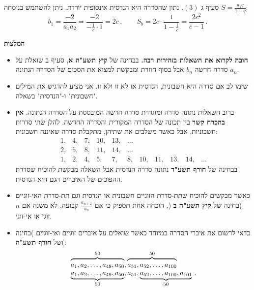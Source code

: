 סעיף ג
$(3)$.
נתון שהסדרה היא הנדסית אינסופית יורדת. ניתן להשתמש בנוסחה 
$S=\displaystyle\frac{a_1q}{1-q}$:
\[
b_1=\frac{-2}{a_1a_2}= \frac{-2}{\displaystyle-\frac{1}{c}\cdot 1}=2c\,,\quad\quad
S_b = 2c\cdot\frac{1}{1-\displaystyle\frac{1}{c}}=\frac{2c^2}{c-1}\,.
\]




\newpage

\begin{center}
\textbf{המלצות}
\end{center}

\begin{itemize}


\item
\textbf{חובה לקרוא את השאלות בזהירות רבה.}
בבחינה של
\textbf{קיץ תשע"ה א},
סעיף ב שואלת על סדרה חדשה
${b_n}$
אבל בסוף חוזרת ומבקשת למצוא את הסכום של הסדרה הנתונה
${a_n}$.

\item
שימו לב אם סדרה היא חשבונית, הנדסית או לא זו ולא זו. אני מציע להדגיש את המילים "חשבונית" ו-"הנדסית" בשאלה.

\item 
ברוב השאלות נתונה סדרה ומוגדרת סדרה חדשה המובססת על הסדרה הנתונה. 
\textbf{אין בהכרח קשר}
בין תכונה של הסדרה המקורית והסדרה החדשה. להלן שתי סדרות חשבוניות, אבל כאשר משלבים את שתיהן, מתקבלת סדרה שאיננה חשבונית:
\[
\begin{array}{rrrrrrrrrrr}
1,& 4,& 7,& 10,& 13,& \ldots\\
2,& 5,& 8,& 11,& 14, &\ldots\\
1,& 2,& 4,& 5,& 7,& 8,& 10,& 11,& 13,& 14, &\ldots
\end{array}
\]
בבחינה של
\textbf{חורף תשע"ד}
נתונה סדרה הנדסית אבל השאלה מבקשת להוכיח שסדרת ההפוכים של האיברים הגם היא הנדסית.

\item
כאשר מבקשים להוכיח שתת-סדרת הזוגיים חשבונית או הנדסית וגם תת-סדרת האי-זוגיים )בחינה של
\textbf{קיץ תשע"ה ב}%
(, הוכחה אחת תספיק כי אם 
$\displaystyle \frac{a_{n+2}}{a_n}$
קבועה, לא משנה אם 
$n$
זוגי או אי-זוגי.


\item

כדאי לרשום את איברי הסדרה במיוחד כאשר שואלים על איברים זוגיים ואי-זוגיים )בחינה של
\textbf{חורף תשע"ה}(:
\[
\begin{array}{l}
\overbrace{\rule{0pt}{8pt}a_1, a_2, \ldots, a_{49}, a_{50}}^{50}, \overbrace{\rule{0pt}{8pt}a_{51}, a_{52},\ldots, a_{100}}^{50}\\
\underbrace{\rule{0pt}{8pt}a_1, a_2, \ldots, a_{49}, a_{50}}_{50}, a_{51}, \underbrace{\rule{0pt}{8pt}a_{52}, \ldots, a_{100}, a_{101}}_{50}\,.
\end{array}
\]
\vspace{-4ex}


\end{itemize}

